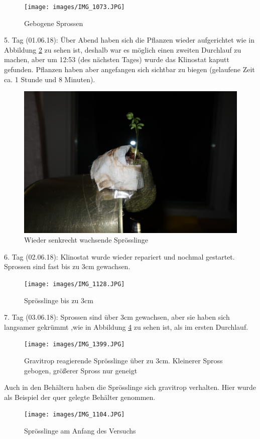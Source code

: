 \documentclass[
a4paper, 
11pt, 
ngerman,
listof=totoc,
bibliography=totocnumbered,
abstracton
]{scrreprt}
\begin{document}
\begin{figure}[H]
	  \centering 
	  \texttt{[image: images/IMG\_1073.JPG]}
	  \caption{Gebogene Sprossen \label{Foto 2}}
\end{figure}



5. Tag (01.06.18): Über Abend haben sich die Pflanzen wieder aufgerichtet wie in Abbildung \ref{Foto 3} zu sehen ist, deshalb war es möglich einen zweiten Durchlauf zu machen, aber um 12:53 (des nächsten Tages) wurde das Klinostat kaputt gefunden. Pflanzen haben aber angefangen sich sichtbar zu biegen (gelaufene Zeit ca. 1 Stunde und 8 Minuten).

\begin{figure}[H]
	\centering 
	\includegraphics[width = .4\linewidth]{images/IMG_1114.JPG}
	\caption{Wieder senkrecht wachsende Sprösslinge \label{Foto 3}}
\end{figure}

6. Tag (02.06.18): Klinostat wurde wieder repariert und nochmal gestartet. Sprossen sind fast bis zu 3cm gewachsen.

\begin{figure}[H]
	\centering 
	\texttt{[image: images/IMG\_1128.JPG]}
	\caption{Sprösslinge bis zu 3cm \label{Foto 4}}
\end{figure}

7. Tag (03.06.18): Sprossen sind über 3cm gewachsen, aber sie haben sich langsamer gekrümmt ,wie in Abbildung \ref{Foto 5} zu sehen ist, als im ersten Durchlauf.

\begin{figure}[H]
	 \centering 
  \texttt{[image: images/IMG\_1399.JPG]}
  	\caption{Gravitrop reagierende Sprösslinge über zu 3cm. Kleinerer Spross gebogen, größerer Spross nur geneigt \label{Foto 5}}
\end{figure} 

 Auch in den Behältern haben die Sprösslinge sich gravitrop verhalten. Hier wurde als Beispiel der quer gelegte Behälter genommen.

\begin{figure}[H]
	\centering 
	\texttt{[image: images/IMG\_1104.JPG]}
	\caption{Sprösslinge am Anfang des Versuchs \label{Foto 6}}
\end{figure} 
\end{document}
